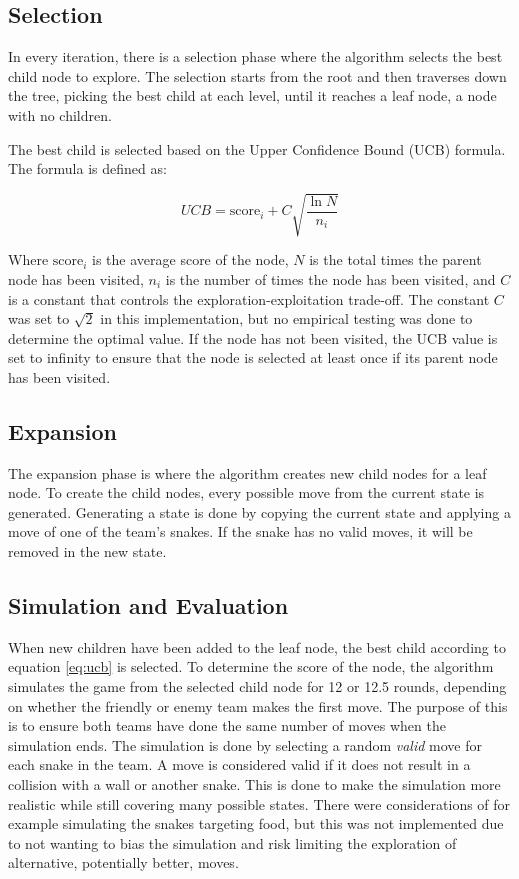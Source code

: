 \documentclass[a4paper,12pt]{article}
\begin{document}
\subsection{Selection}
In every iteration, there is a selection phase where the algorithm selects the best child node to explore. The selection starts from the root and then traverses down the tree, picking the best child at each level, until it reaches a leaf node, a node with no children.


The best child is selected based on the Upper Confidence Bound (UCB) formula. The formula is defined as:

\begin{equation} \label{eq:ucb}
    UCB = \text{score}_i + C \sqrt{\frac{\ln{N}}{n_i}}
\end{equation}

Where $\text{score}_i$ is the average score of the node, $N$ is the total times the parent node has been visited, $n_i$ is the number of times the node has been visited, and $C$ is a constant that controls the exploration-exploitation trade-off. The constant $C$ was set to $\sqrt{2}$ in this implementation, but no empirical testing was done to determine the optimal value. If the node has not been visited, the UCB value is set to infinity to ensure that the node is selected at least once if its parent node has been visited.


\subsection{Expansion}

The expansion phase is where the algorithm creates new child nodes for a leaf node. To create the child nodes, every possible move from the current state is generated. Generating a state is done by copying the current state and applying a move of one of the team's snakes. If the snake has no valid moves, it will be removed in the new state. 



\subsection{Simulation and Evaluation}

When new children have been added to the leaf node, the best child according to equation \ref{eq:ucb} is selected. To determine the score of the node, the algorithm simulates the game from the selected child node for 12 or 12.5 rounds, depending on whether the friendly or enemy team makes the first move. The purpose of this is to ensure both teams have done the same number of moves when the simulation ends. The simulation is done by selecting a random \textit{valid} move for each snake in the team. A move is considered valid if it does not result in a collision with a wall or another snake. This is done to make the simulation more realistic while still covering many possible states. There were considerations of for example simulating the snakes targeting food, but this was not implemented due to not wanting to bias the simulation and risk limiting the exploration of alternative, potentially better, moves.
\end{document}
